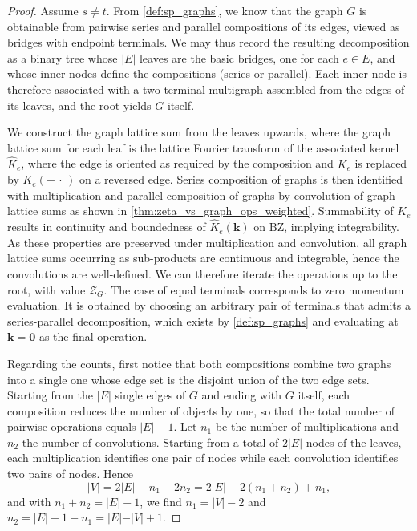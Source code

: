 \documentclass[]{amsart}
\numberwithin{mythm}{section}
\begin{document}
\begin{proof}
    Assume $s\neq t$. From \cref{def:sp_graphs}, we know that the graph $G$ is obtainable from pairwise series and parallel compositions of its edges, viewed as bridges with endpoint terminals. We may thus record the resulting decomposition as a binary tree whose $\vert E\vert$ leaves are the basic bridges, one for each $e\in E$, and whose inner nodes define the compositions (series or parallel). Each inner node is therefore associated with a two-terminal multigraph assembled from the edges of its leaves, and the root yields $G$ itself.
    
    We construct the graph lattice sum from the leaves upwards, where the graph lattice sum for each leaf is the lattice Fourier transform of the associated kernel $\hat K_e$, where the edge is oriented as required by the composition and $K_e$ is replaced by $K_e(-\,\cdot\,)$ on a reversed edge. Series composition of graphs is then identified with multiplication and parallel composition of graphs by convolution of graph lattice sums as shown in \cref{thm:zeta_vs_graph_ops_weighted}. Summability of $K_e$ results in continuity and boundedness of $\hat K_e(\bm k)$ on $\mathrm{BZ}$, implying integrability. As these properties are preserved under multiplication and convolution, all graph lattice sums occurring as sub-products are continuous and integrable, hence the convolutions are well-defined. We can therefore iterate the operations up to the root, with value $\mathcal Z_G$. The case of equal terminals corresponds to zero momentum evaluation. It is obtained by choosing an arbitrary pair of terminals that admits a series-parallel decomposition, which exists by \cref{def:sp_graphs} and evaluating at $\bm k=\bm 0$ as the final operation.

Regarding the counts, first notice that both compositions combine two graphs into a single one whose edge set is the disjoint union of the two edge sets. Starting from the $\vert E\vert$ single edges of $G$ and ending with $G$ itself, each composition reduces the number of objects by one, so that the total number of pairwise operations equals $\vert E\vert-1$. Let $n_{1}$ be the number of multiplications and $n_2$ the number of convolutions. Starting from a total of $2|E|$ nodes of the leaves, each multiplication identifies one pair of nodes while each convolution identifies two pairs of nodes. Hence
\[
\vert V\vert =2\vert E\vert -n_1 -2n_2=2\vert E\vert -2(n_1 +n_2)+n_1,
\]
and with $n_1+n_2=|E|-1$, we find $n_1=\vert V\vert -2$ and $n_2=\vert E\vert-1-n_1=\vert E\vert -\vert V\vert +1$. 
\end{proof}
\end{document}
